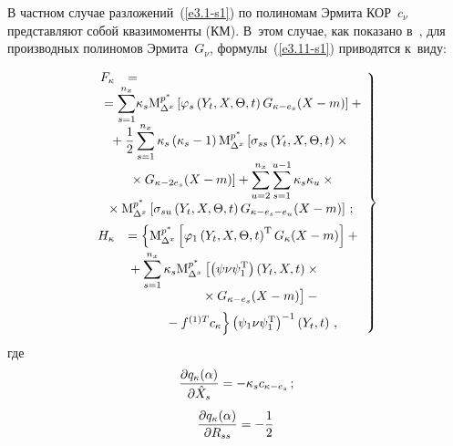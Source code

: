 \begin{multicols}{2}
В частном случае разложений~(\ref{e3.1-s1}) по
полиномам Эрмита КОР~$c_\nu$ представляют собой
квазимоменты (КМ). В~этом случае, как показано в~\cite{7-s1, 6-s1}, 
для производных полиномов Эрмита~$G_\nu$, формулы~(\ref{e3.11-s1}) приводятся к~виду:

\columnbreak

\noindent
  \begin{equation}
  \left.
  \begin{array}{rl}
    \hspace*{-3mm}F_\kappa &={}\\
&\hspace*{-7.5mm}    {}=\displaystyle\sss_{s=1}^{n_x}\! \kappa_s
    \mm_{\Delta^x}^{p^*}\lk \varphi_s \left(Y_t,X,\Theta,t\right)G_{\kappa-e_s} (X-m)\rk+{}\!\!\\[6pt]
&   \hspace*{-5mm} {}+\fr{1}{2} \displaystyle\sss_{s=1}^{n_x}  \kappa_s \left(\kappa_s-1\right)
     \mm_{\Delta^x}^{p^*}\left[ 
     \si_{ss} \left(Y_t,X,\Theta,t\right)\times {}\right.\\[6pt]
&\left.    {}\times G_{\kappa-2e_s}(X-m)
     \right]+ \displaystyle\sss_{u=2}^{n_x} \sss_{s=1}^{u-1}  \kappa_s
    \kappa_u  \times{}\\[6pt]
 &   \hspace*{-6mm}{}\times \mm_{\Delta^x}^{p^*}\lk \si_{su} \left(Y_t,X,\Theta,t\right)
    G_{\kappa-e_s-e_u}(X-m)\rk\,;
\\[6pt]
      \hspace*{-3mm} H_\kappa &= \left\{
     \mm_{\Delta^x}^{p^*}\left[
    \varphi_1 \left(Y_t,X,\Theta,t\right)^{\mathrm{T}} G_{\kappa} (X-m) \right]+{}\right.\\[6pt]
&\displaystyle{}+\sss_{s=1}^{n_x} \kappa_s
     \mm_{\Delta^x}^{p^*}\left[ \left(\psi\nu\psi_1^{\mathrm{T}}\right) 
     \left(Y_t,X,t\right)\times{}\right.\\
     &\left.\hspace*{20mm}{}\times G_{\kappa-e_s} (X-m) 
     \vphantom{\psi^T}\right]-{}\\[6pt]
&\left.\hspace*{10mm}{}-f^{(1)T} c_\kappa 
\vphantom{Y_t\left(\Theta\right)^T}\right\} \left(\psi_1\nu\psi_1^{\mathrm{T}}
\right)^{-1} 
\left(Y_t,t\right)\,,
\end{array}\!
\right\}\!\!\!
\label{e3.12-s1}
\end{equation}
где
    $$\displaystyle\frac{\displaystyle \partial q_\kappa (\alpha)\mathstrut}{\displaystyle \partial \hat X_s\mathstrut} = -\kappa_s
    c_{\kappa-e_s}\,;
    $$
    $$
    \displaystyle\frac{\displaystyle \partial q_\kappa (\alpha)\mathstrut}{\displaystyle \partial R_{ss}\mathstrut}= -\displaystyle\frac{\displaystyle 1\mathstrut}{\displaystyle 2\mathstrut}\,
$$
\end{multicols}
